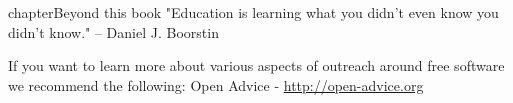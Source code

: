 chapter{Beyond this book}
"Education is learning what you didn't even know you didn't know." -- Daniel J. Boorstin

If you want to learn more about various aspects of outreach around free software we recommend the following:
Open Advice - \url{http://open-advice.org}